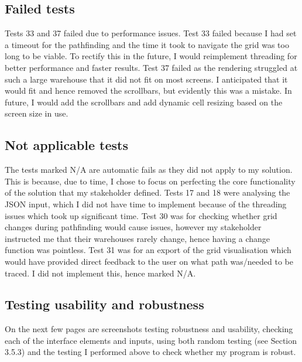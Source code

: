 \subsection{Failed tests}

Tests 33 and 37 failed due to performance issues. Test 33 failed because I had set a timeout for the pathfinding and the time it took to navigate the grid was too long to be viable. To rectify this in the future, I would reimplement threading for better performance and faster results. Test 37 failed as the rendering struggled at such a large warehouse that it did not fit on most screens. I anticipated that it would fit and hence removed the scrollbars, but evidently this was a mistake. In future, I would add the scrollbars and add dynamic cell resizing based on the screen size in use.

\subsection{Not applicable tests}

The tests marked N/A are automatic fails as they did not apply to my solution. This is because, due to time, I chose to focus on perfecting the core functionality of the solution that my stakeholder defined. Tests 17 and 18 were analysing the JSON input, which I did not have time to implement because of the threading issues which took up significant time. Test 30 was for checking whether grid changes during pathfinding would cause issues, however my stakeholder instructed me that their warehouses rarely change, hence having a change function was pointless. Test 31 was for an export of the grid visualisation which would have provided direct feedback to the user on what path was/needed to be traced. I did not implement this, hence marked N/A.

\subsection{Testing usability and robustness}

On the next few pages are screenshots testing robustness and usability, checking each of the interface elements and inputs, using both random testing (see Section 3.5.3) and the testing I performed above to check whether my program is robust.

\newpage





